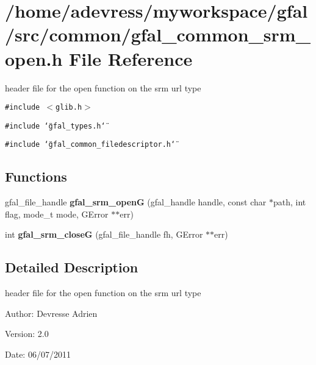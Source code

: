 \section{/home/adevress/myworkspace/gfal/src/common/gfal\_\-common\_\-srm\_\-open.h File Reference}
\label{gfal__common__srm__open_8h}
header file for the open function on the srm url type 

{\tt \#include $<$glib.h$>$}\par
{\tt \#include \char`\"{}gfal\_\-types.h\char`\"{}}\par
{\tt \#include \char`\"{}gfal\_\-common\_\-filedescriptor.h\char`\"{}}\par
\subsection*{Functions}
\begin{CompactItemize}
\item 
gfal\_\-file\_\-handle \textbf{gfal\_\-srm\_\-open\-G} (gfal\_\-handle handle, const char $\ast$path, int flag, mode\_\-t mode, GError $\ast$$\ast$err)\label{gfal__common__srm__open_8h_bb27bc48091a2a9a4ca124a35d3847a5}

\item 
int \textbf{gfal\_\-srm\_\-close\-G} (gfal\_\-file\_\-handle fh, GError $\ast$$\ast$err)\label{gfal__common__srm__open_8h_1b78856858fbfc8244d098fef0231d7d}

\end{CompactItemize}


\subsection{Detailed Description}
header file for the open function on the srm url type 

\begin{Desc}
\item[Author:]Devresse Adrien \end{Desc}
\begin{Desc}
\item[Version:]2.0 \end{Desc}
\begin{Desc}
\item[Date:]06/07/2011 \end{Desc}

